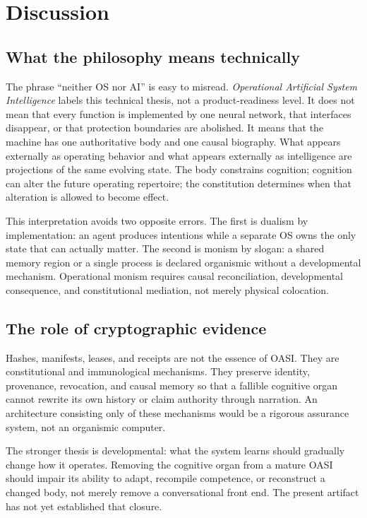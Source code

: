 \documentclass[journal,10pt]{IEEEtran}
\newcommand{\OASI}{\textsc{OASI}}
\begin{document}
\section{Discussion}
\subsection{What the philosophy means technically}
The phrase ``neither OS nor AI'' is easy to misread. \emph{Operational Artificial System Intelligence} labels this technical thesis, not a product-readiness level. It does not mean that every function is implemented by one neural network, that interfaces disappear, or that protection boundaries are abolished. It means that the machine has one authoritative body and one causal biography. What appears externally as operating behavior and what appears externally as intelligence are projections of the same evolving state. The body constrains cognition; cognition can alter the future operating repertoire; the constitution determines when that alteration is allowed to become effect.

This interpretation avoids two opposite errors. The first is dualism by implementation: an agent produces intentions while a separate OS owns the only state that can actually matter. The second is monism by slogan: a shared memory region or a single process is declared organismic without a developmental mechanism. Operational monism requires causal reconciliation, developmental consequence, and constitutional mediation, not merely physical colocation.

\subsection{The role of cryptographic evidence}
Hashes, manifests, leases, and receipts are not the essence of \OASI{}. They are constitutional and immunological mechanisms. They preserve identity, provenance, revocation, and causal memory so that a fallible cognitive organ cannot rewrite its own history or claim authority through narration. An architecture consisting only of these mechanisms would be a rigorous assurance system, not an organismic computer.

The stronger thesis is developmental: what the system learns should gradually change how it operates. Removing the cognitive organ from a mature \OASI{} should impair its ability to adapt, recompile competence, or reconstruct a changed body, not merely remove a conversational front end. The present artifact has not yet established that closure.
\end{document}

